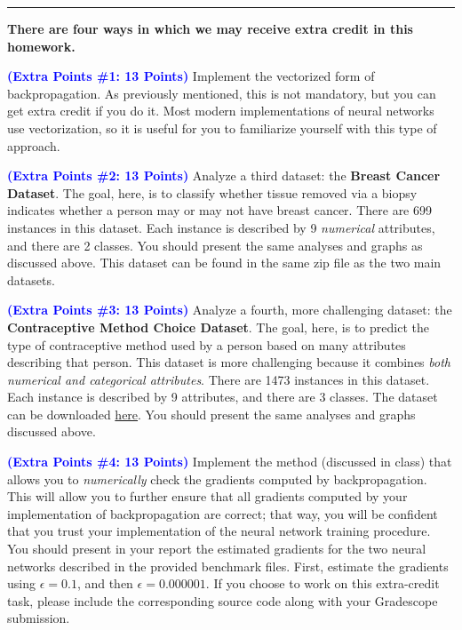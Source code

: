 \documentclass[letterpaper]{article}
\newcommand{\HIGHLIGHT}[1]{\textcolor{blue}{\textbf{#1}}}
\begin{document}
\vspace{1cm}
\noindent\rule{\textwidth}{1pt}

\textbf{There are four ways in which we may receive extra credit in this homework.}

\noindent \HIGHLIGHT{(Extra Points \#1: 13 Points)} 
Implement the vectorized form of backpropagation. As previously mentioned, this is not mandatory, but you can get extra credit if you do it. Most modern implementations of neural networks use vectorization, so it is useful for you to familiarize yourself with this type of approach. 

\noindent \HIGHLIGHT{(Extra Points \#2: 13 Points)} 
Analyze a third dataset: the \textbf{Breast Cancer Dataset}. The goal, here, is to classify whether tissue removed via a biopsy indicates whether a person may or may not have breast cancer. There are 699 instances in this dataset. Each instance is described by 9 \textit{numerical} attributes, and there are 2 classes. You should present the same analyses and graphs as discussed above. This dataset can be found in the same zip file as the two main datasets.

\noindent \HIGHLIGHT{(Extra Points \#3: 13 Points)}    
Analyze a fourth, more challenging dataset: the \textbf{Contraceptive Method Choice Dataset}. The goal, here, is to predict the type of contraceptive method used by a person based on many attributes describing that person. This dataset is more challenging because it combines \textit{both numerical and categorical attributes}. There are 1473 instances in this dataset. Each instance is described by 9 attributes, and there are 3 classes. The dataset can be downloaded \href{https://archive.ics.uci.edu/ml/datasets/Contraceptive+Method+Choice}{here}. You should present the same analyses and graphs discussed above.

\noindent \HIGHLIGHT{(Extra Points \#4: 13 Points)}
Implement the method (discussed in class) that allows you to \textit{numerically} check the gradients computed by backpropagation. This will allow you to further ensure that all gradients computed by your implementation of backpropagation are correct; that way, you will be confident that you trust your implementation of the neural network training procedure. You should present in your report the estimated gradients for the two neural networks described in the provided benchmark files. First, estimate the gradients using $\epsilon=0.1$, and then $\epsilon=0.000001$. If you choose to work on this extra-credit task, please include the corresponding source code along with your Gradescope submission.
\end{document}
